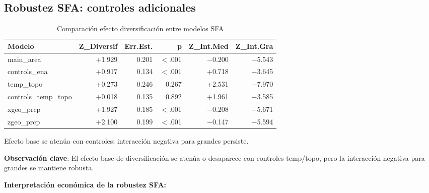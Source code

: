 \documentclass[11pt,a4paper]{article}
\begin{document}
\subsection{Robustez SFA: controles adicionales}

\begin{table}[H]
\centering
\caption{Comparación efecto diversificación entre modelos SFA}
\label{tab:sfa_compare_all}
\begin{threeparttable}
\small
\begin{tabular}{lrrrrr}
\toprule
\textbf{Modelo} & \textbf{Z\_Diversif} & \textbf{Err.Est.} & \textbf{p} & \textbf{Z\_Int.Med} & \textbf{Z\_Int.Gra} \\
\midrule
main\_area & +1.929 & 0.201 & $<$.001 & $-$0.200 & $-$5.543 \\
controls\_ena & +0.917 & 0.134 & $<$.001 & +0.718 & $-$3.645 \\
temp\_topo & +0.273 & 0.246 & 0.267 & +2.531 & $-$7.970 \\
controls\_temp\_topo & +0.018 & 0.135 & 0.892 & +1.961 & $-$3.585 \\
xgeo\_prcp & +1.927 & 0.185 & $<$.001 & $-$0.208 & $-$5.671 \\
zgeo\_prcp & +2.100 & 0.199 & $<$.001 & $-$0.147 & $-$5.594 \\
\bottomrule
\end{tabular}
\begin{tablenotes}
\footnotesize
\item Efecto base se atenúa con controles; interacción negativa para grandes persiste.
\end{tablenotes}
\end{threeparttable}
\end{table}

\textbf{Observación clave}: El efecto base de diversificación se atenúa o desaparece con controles temp/topo, pero la interacción negativa para grandes se mantiene robusta.

\textbf{Interpretación económica de la robustez SFA:}
\end{document}
